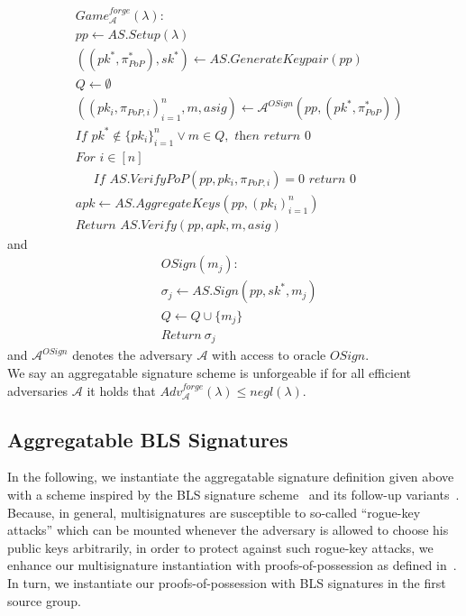 \begin{align*}
&\mathit{Game}^{\mathit{forge}}_{\mathcal{A}}({\lambda}): \\
& \mathit{pp} \leftarrow \mathit{AS.Setup(\lambda)} \\
& ((\mathit{pk}^*,\pi^*_{\mathit{PoP}}), \mathit{sk}^*) \leftarrow \mathit{AS.GenerateKeypair}(\mathit{pp})\\
& Q \leftarrow \emptyset \\
& ((\mathit{pk_i}, \pi_{\mathit{PoP},i})_{i=1}^{n}, m, \mathit{asig}) \leftarrow \mathcal{A}^{\mathit{OSign}}(\mathit{pp}, (\mathit{pk^*},\pi^*_{\mathit{PoP}})) \\
& \textit{If } \mathit{pk}^* \notin \{\mathit{pk_i}\}_{i=1}^{n} \vee m \in Q, \textit{ then return } 0 \\
& \textit{For } i \in [n] \\
& \ \ \ \ \ \textit{ If } \mathit{AS.VerifyPoP}(\mathit{pp}, \mathit{pk_i}, \pi_{\mathit{PoP},i})=0  \textit{ return } 0 \\
& \mathit{apk} \leftarrow \mathit{AS.AggregateKeys}(\mathit{pp}, (\mathit{pk_i})_{i=1}^{n}) \\
& \textit{Return } \mathit{AS.Verify}(\mathit{pp}, \mathit{apk}, m, \mathit{asig})
\end{align*}
\noindent and
\begin{align*}
& \mathit{OSign}(m_j): \\
& \sigma_j \leftarrow \mathit{AS.Sign}(\mathit{pp}, \mathit{sk}^*, m_j) \\
&  Q \leftarrow Q \cup \{m_j\} \\
& \textit{Return} \ \sigma_j
\end{align*}
\noindent and $\mathcal{A}^{\mathit{OSign}}$ denotes the adversary $\mathcal{A}$ with access to oracle $\mathit{OSign}$. \\
\noindent We say an aggregatable signature scheme is unforgeable if for all efficient adversaries
$\mathcal{A}$ it holds that $\mathit{Adv}^{\mathit{forge}}_{\mathcal{A}}({\lambda}) \leq \mathit{negl}(\lambda)$. 

\subsection{Aggregatable BLS Signatures}
\label{sec:bls}
\noindent In the following, we instantiate the aggregatable signature definition given above with a scheme inspired by the BLS signature
scheme~\cite{BLS_signatures} and its follow-up variants~\cite{proofs_of_posession,boneh_compact_multisig}.
Because, in general, multisignatures are susceptible to so-called ``rogue-key attacks'' which can be
mounted whenever the adversary is allowed to choose his public keys arbitrarily, in order to protect against such
rogue-key attacks, we enhance our multisignature instantiation with proofs-of-possession as defined in~\cite{proofs_of_posession}.
In turn, we instantiate our proofs-of-possession with BLS signatures in the first source group.  

